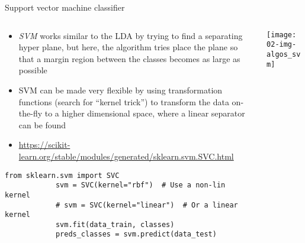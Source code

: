   \begin{frame}[fragile]{Support vector machine classifier}
    \begin{columns}
      \begin{column}{0.65\textwidth}
        \begin{itemize}
          \item \emph{SVM} works similar to the LDA by trying to find a separating hyper plane, but here, the algorithm tries place the plane so that a margin region between the classes becomes as large as possible
          \item SVM can be made very flexible by using transformation functions (search for \enquote{kernel trick}) to transform the data on-the-fly to a higher dimensional space, where a linear separator can be found
          \item \small\url{https://scikit-learn.org/stable/modules/generated/sklearn.svm.SVC.html}
        \end{itemize}
        \begin{mdframed}
          \begin{lstlisting}[style=dark, gobble=10, title=\lsttitlelight{LDA classification [Note: example shortened]}]
            from sklearn.svm import SVC
            svm = SVC(kernel="rbf")  # Use a non-lin kernel
            # svm = SVC(kernel="linear")  # Or a linear kernel
            svm.fit(data_train, classes)
            preds_classes = svm.predict(data_test)
          \end{lstlisting}
        \end{mdframed}
      \end{column}
      \begin{column}{0.35\textwidth}
        \vspace{1em}

        \texttt{[image: 02-img-algos\_svm]}
      \end{column}
    \end{columns}
  \end{frame}

